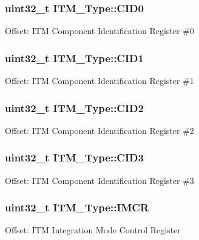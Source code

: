 \subsubsection[{\texorpdfstring{C\+I\+D0}{CID0}}]{ uint32\+\_\+t I\+T\+M\+\_\+\+Type\+::\+C\+I\+D0}\hypertarget{structITM__Type_a413f3bb0a15222e5f38fca4baeef14f6}{}\label{structITM__Type_a413f3bb0a15222e5f38fca4baeef14f6}
Offset\+: I\+TM Component Identification Register \#0 
\subsubsection[{\texorpdfstring{C\+I\+D1}{CID1}}]{ uint32\+\_\+t I\+T\+M\+\_\+\+Type\+::\+C\+I\+D1}\hypertarget{structITM__Type_a5f7d524b71f49e444ff0d1d52b3c3565}{}\label{structITM__Type_a5f7d524b71f49e444ff0d1d52b3c3565}
Offset\+: I\+TM Component Identification Register \#1 
\subsubsection[{\texorpdfstring{C\+I\+D2}{CID2}}]{ uint32\+\_\+t I\+T\+M\+\_\+\+Type\+::\+C\+I\+D2}\hypertarget{structITM__Type_adee4ccce1429db8b5db3809c4539f876}{}\label{structITM__Type_adee4ccce1429db8b5db3809c4539f876}
Offset\+: I\+TM Component Identification Register \#2 
\subsubsection[{\texorpdfstring{C\+I\+D3}{CID3}}]{ uint32\+\_\+t I\+T\+M\+\_\+\+Type\+::\+C\+I\+D3}\hypertarget{structITM__Type_a0e7aa199619cc7ac6baddff9600aa52e}{}\label{structITM__Type_a0e7aa199619cc7ac6baddff9600aa52e}
Offset\+: I\+TM Component Identification Register \#3 
\subsubsection[{\texorpdfstring{I\+M\+CR}{IMCR}}]{ uint32\+\_\+t I\+T\+M\+\_\+\+Type\+::\+I\+M\+CR}\hypertarget{structITM__Type_ab2e87d8bb0e3ce9b8e0e4a6a6695228a}{}\label{structITM__Type_ab2e87d8bb0e3ce9b8e0e4a6a6695228a}
Offset\+: I\+TM Integration Mode Control Register 
